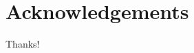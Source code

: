\documentclass[10pt,letterpaper]{article}
\begin{document}
\section*{Acknowledgements}

Thanks!

\nolinenumbers

%
%
% 



\end{document}
